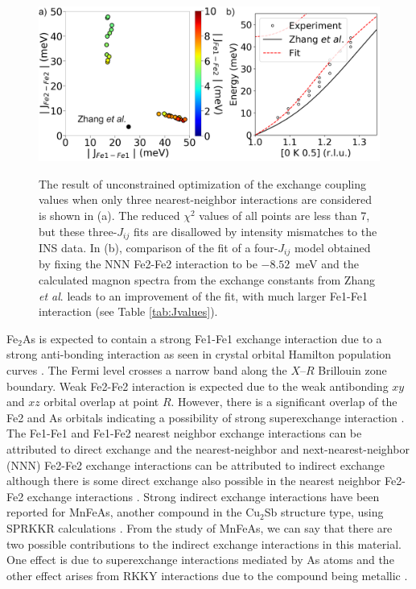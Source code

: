 \documentclass[10pt,doublespacing,edeposit]{uiucthesis2020}
\begin{document}
\begin{mainmatter}
\begin{figure}
\centering\includegraphics[width=0.8\columnwidth]{figures/ch8/magnon_spectra_refinement.png} \\
\caption{\label{fig:zhang_spinw_refinement}
The result of unconstrained optimization of the exchange coupling values when only three nearest-neighbor interactions are considered is shown in (a). The reduced $\chi^2$ values of all points are less than 7, but these three-$J_{ij}$ fits are disallowed by intensity mismatches to the INS data. In (b), comparison of the fit of a four-$J_{ij}$ model obtained by fixing the NNN Fe2-Fe2 interaction to be $-8.52$~meV and the calculated magnon spectra from the exchange constants from Zhang \emph{et al}. \cite{Zhang2013} leads to an improvement of the fit, with much larger Fe1-Fe1 interaction (see Table \ref{tab:Jvalues}). 
}
\end{figure}

Fe$_2$As is expected to contain a strong Fe1-Fe1 exchange interaction due to a strong anti-bonding interaction as seen in crystal orbital Hamilton population curves \cite{Zhang2013}.
The Fermi level crosses a narrow band along the $X$--$R$ Brillouin zone boundary. Weak Fe2-Fe2 interaction is expected due to the weak antibonding $xy$ and $xz$ orbital overlap at point $R$. However, there is a significant overlap of the Fe2 and As orbitals indicating a possibility of strong superexchange interaction \cite{Zhang2013}. The Fe1-Fe1 and Fe1-Fe2 nearest neighbor exchange interactions can be attributed to direct exchange and the nearest-neighbor and next-nearest-neighbor (NNN) Fe2-Fe2 exchange interactions can be attributed to indirect exchange although there is some direct exchange also possible in the nearest neighbor Fe2-Fe2 exchange interactions \cite{Zhang2013}.  Strong indirect exchange interactions have been reported for MnFeAs, another compound in the Cu$_2$Sb structure type, using SPRKKR calculations \cite{Zhang2015}. From the study of MnFeAs, we can say that there are two possible contributions to the indirect exchange interactions in this material. One effect is due to superexchange interactions mediated by As atoms and the other effect arises from RKKY interactions due to the compound being metallic \cite{Zhang2015}.



\end{mainmatter}
\end{document}
